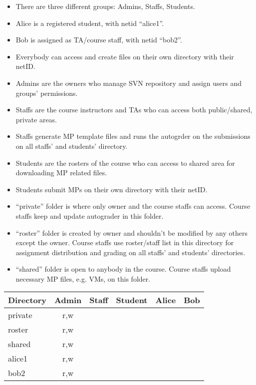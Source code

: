 \documentclass[addpoints]{exam}
\begin{document}
\begin{questions}
\begin{parts}
\begin{itemize}
\item There are three different groups: Admins, Staffs, Students.
\item Alice is a registered student, with netid ``alice1''.
\item Bob is assigned as TA/course staff, with netid ``bob2''.
\item Everybody can access and create files on their own directory with their netID.
\item Admins are the owners who manage SVN repository and assign users and groups' permissions.
\item Staffs are the course instructors and TAs who can access both public/shared, private areas.
\item Staffs generate MP template files and runs the autogrder on the submissions on all staffs' and students' directory.
\item Students are the rosters of the course who can access to shared area for downloading MP related files.
\item Students submit MPs on their own directory with their netID.
\item ``private'' folder is where only owner and the course staffs can access. Course staffs keep and update autograder in this folder. 
\item ``roster'' folder is created by owner and shouldn't be modified by any others except the owner. Course staffs use roster/staff list in this directory for assignment distribution and grading on all staffs' and students' directories.
\item ``shared'' folder is open to anybody in the course. Course staffs upload necessary MP files, e.g. VMs, on this folder.

\end{itemize}

\begin{table}[h]
\centering
  \begin{tabular}{l||c|c|c|c|c}
  \hline
  Directory & Admin & Staff & Student & Alice & Bob \\ \hline \hline
  private & r,w &  &  &  & \\ \hline
  roster & r,w &  &  &  & \\ \hline
  shared & r,w &  &  &  & \\ \hline
  alice1 & r,w &  &  &  & \\ \hline
  bob2 & r,w &  &  &  & \\
  \hline
  \end{tabular}
\end{table}


\end{parts}
\end{questions}
\end{document}
